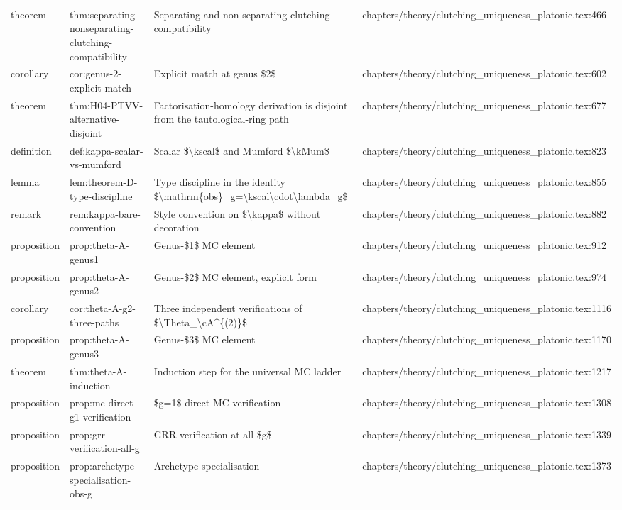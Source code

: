 \documentclass[11pt]{article}
\begin{document}
\begin{longtable}{L{0.10\textwidth}L{0.26\textwidth}L{0.42\textwidth}L{0.22\textwidth}}
theorem & thm:separating-nonseparating-clutching-compatibility & Separating and non-separating clutching compatibility & chapters/theory/clutching\_uniqueness\_platonic.tex:466\\
corollary & cor:genus-2-explicit-match & Explicit match at genus \$2\$ & chapters/theory/clutching\_uniqueness\_platonic.tex:602\\
theorem & thm:H04-PTVV-alternative-disjoint & Factorisation-homology derivation is disjoint from the tautological-ring path & chapters/theory/clutching\_uniqueness\_platonic.tex:677\\
definition & def:kappa-scalar-vs-mumford & Scalar \$\textbackslash{}kscal\$ and Mumford \$\textbackslash{}kMum\$ & chapters/theory/clutching\_uniqueness\_platonic.tex:823\\
lemma & lem:theorem-D-type-discipline & Type discipline in the identity \$\textbackslash{}mathrm\{obs\}\_g=\textbackslash{}kscal\textbackslash{}cdot\textbackslash{}lambda\_g\$ & chapters/theory/clutching\_uniqueness\_platonic.tex:855\\
remark & rem:kappa-bare-convention & Style convention on \$\textbackslash{}kappa\$ without decoration & chapters/theory/clutching\_uniqueness\_platonic.tex:882\\
proposition & prop:theta-A-genus1 & Genus-\$1\$ MC element & chapters/theory/clutching\_uniqueness\_platonic.tex:912\\
proposition & prop:theta-A-genus2 & Genus-\$2\$ MC element, explicit form & chapters/theory/clutching\_uniqueness\_platonic.tex:974\\
corollary & cor:theta-A-g2-three-paths & Three independent verifications of \$\textbackslash{}Theta\_\textbackslash{}cA\textasciicircum{}\{(2)\}\$ & chapters/theory/clutching\_uniqueness\_platonic.tex:1116\\
proposition & prop:theta-A-genus3 & Genus-\$3\$ MC element & chapters/theory/clutching\_uniqueness\_platonic.tex:1170\\
theorem & thm:theta-A-induction & Induction step for the universal MC ladder & chapters/theory/clutching\_uniqueness\_platonic.tex:1217\\
proposition & prop:mc-direct-g1-verification & \$g=1\$ direct MC verification & chapters/theory/clutching\_uniqueness\_platonic.tex:1308\\
proposition & prop:grr-verification-all-g & GRR verification at all \$g\$ & chapters/theory/clutching\_uniqueness\_platonic.tex:1339\\
proposition & prop:archetype-specialisation-obs-g & Archetype specialisation & chapters/theory/clutching\_uniqueness\_platonic.tex:1373\\

\end{longtable}
\end{document}
